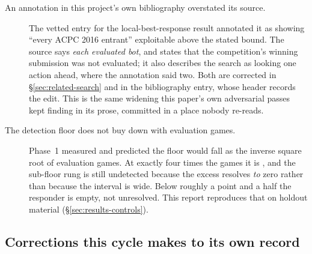 \begin{description}
\item[An annotation in this project's own bibliography overstated its source.] The vetted entry for
  the local-best-response result annotated it as showing ``every ACPC 2016 entrant'' exploitable
  above the stated bound. The source says \emph{each evaluated bot}, and states that the
  competition's winning submission was not evaluated; it also describes the search as looking one
  action ahead, where the annotation said two. Both are corrected in
  \S\ref{sec:related-search} and in the bibliography entry, whose header records the edit. This is
  the same widening this paper's own adversarial passes kept finding in its prose, committed in a
  place nobody re-reads.

\item[The detection floor does not buy down with evaluation games.] Phase~1 measured
  \vsevenFloorPhaseOne{} and predicted the floor would fall as the inverse square root of evaluation
  games. At exactly four times the games it is \vsevenPrimaryFloor{}, and the sub-floor rung is still
  undetected because the excess resolves \emph{to} zero rather than because the interval is wide. Below
  roughly a point and a half the responder is empty, not unresolved. This report reproduces that on
  holdout material (\S\ref{sec:results-controls}).

\end{description}

\subsection{Corrections this cycle makes to its own record}
\label{sec:corrections-self}

